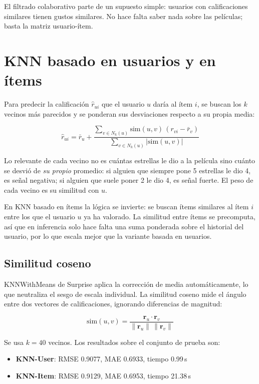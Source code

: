 El filtrado colaborativo parte de un supuesto simple: usuarios con calificaciones similares tienen gustos similares. No hace falta saber nada sobre las películas; basta la matriz usuario-ítem.

\section{KNN basado en usuarios y en ítems}

Para predecir la calificación $\hat{r}_{ui}$ que el usuario $u$ daría al ítem $i$, se buscan los $k$ vecinos más parecidos y se ponderan sus desviaciones respecto a su propia media:

\begin{equation}
    \hat{r}_{ui} = \bar{r}_u +
    \frac{\displaystyle\sum_{v \in N_k(u)} \mathrm{sim}(u,v)\,(r_{vi} - \bar{r}_v)}
         {\displaystyle\sum_{v \in N_k(u)} |\mathrm{sim}(u,v)|}
\end{equation}

Lo relevante de cada vecino no es cuántas estrellas le dio a la película sino cuánto se desvió de \emph{su propio} promedio: si alguien que siempre pone 5 estrellas le dio 4, es señal negativa; si alguien que suele poner 2 le dio 4, es señal fuerte. El peso de cada vecino es su similitud con $u$.

En KNN basado en ítems la lógica se invierte: se buscan ítems similares al ítem $i$ entre los que el usuario $u$ ya ha valorado. La similitud entre ítems se precomputa, así que en inferencia solo hace falta una suma ponderada sobre el historial del usuario, por lo que escala mejor que la variante basada en usuarios.

\subsection{Similitud coseno}

KNNWithMeans de Surprise aplica la corrección de media automáticamente, lo que neutraliza el sesgo de escala individual. La similitud coseno mide el ángulo entre dos vectores de calificaciones, ignorando diferencias de magnitud:

\begin{equation}
    \mathrm{sim}(u,v) = \frac{\mathbf{r}_u \cdot \mathbf{r}_v}{\|\mathbf{r}_u\|\,\|\mathbf{r}_v\|}
\end{equation}

Se usa $k = 40$ vecinos. Los resultados sobre el conjunto de prueba son:

\begin{itemize}
    \item \textbf{KNN-User}: RMSE 0.9077, MAE 0.6933, tiempo 0.99\,s
    \item \textbf{KNN-Item}: RMSE 0.9129, MAE 0.6953, tiempo 21.38\,s
\end{itemize}

